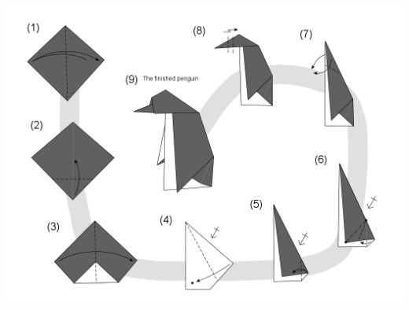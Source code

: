 \documentclass[14pt,letterpaper,norsk]{article}
\begin{document}
\newpage

\includegraphics[width=\textwidth]{penguin_diag.png}
\end{document}
